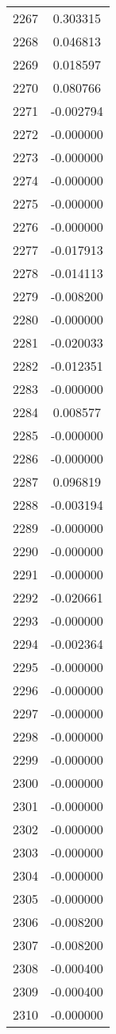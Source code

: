 \documentclass[12pt]{article}
\begin{document}
\begin{longtable}{@{}cc@{}}
2267 & 0.303315 \\
2268 & 0.046813 \\
2269 & 0.018597 \\
2270 & 0.080766 \\
2271 & -0.002794 \\
2272 & -0.000000 \\
2273 & -0.000000 \\
2274 & -0.000000 \\
2275 & -0.000000 \\
2276 & -0.000000 \\
2277 & -0.017913 \\
2278 & -0.014113 \\
2279 & -0.008200 \\
2280 & -0.000000 \\
2281 & -0.020033 \\
2282 & -0.012351 \\
2283 & -0.000000 \\
2284 & 0.008577 \\
2285 & -0.000000 \\
2286 & -0.000000 \\
2287 & 0.096819 \\
2288 & -0.003194 \\
2289 & -0.000000 \\
2290 & -0.000000 \\
2291 & -0.000000 \\
2292 & -0.020661 \\
2293 & -0.000000 \\
2294 & -0.002364 \\
2295 & -0.000000 \\
2296 & -0.000000 \\
2297 & -0.000000 \\
2298 & -0.000000 \\
2299 & -0.000000 \\
2300 & -0.000000 \\
2301 & -0.000000 \\
2302 & -0.000000 \\
2303 & -0.000000 \\
2304 & -0.000000 \\
2305 & -0.000000 \\
2306 & -0.008200 \\
2307 & -0.008200 \\
2308 & -0.000400 \\
2309 & -0.000400 \\
2310 & -0.000000 \\

\end{longtable}
\end{document}
